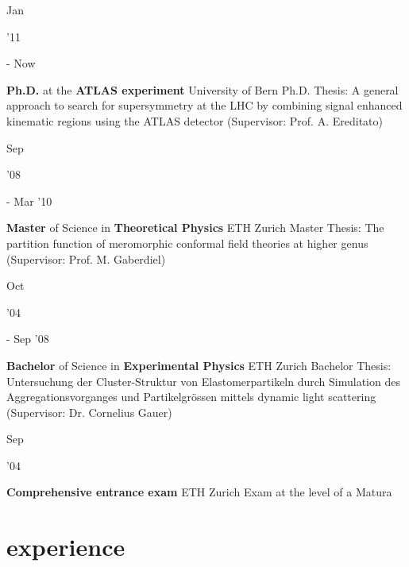 \documentclass[]{cv} %
\begin{document}
\begin{entrylist}
\entry
{\parbox[t]{\parboxWidthOne}{Jan}\parbox[t]{\parboxWidthTwo}{\hfill '11} - Now}
{\textbf{Ph.D.} at the \textbf{ATLAS experiment}}
{University of Bern}
{Ph.D. Thesis: A general approach to search for supersymmetry at the LHC by combining signal enhanced kinematic regions using the ATLAS detector (Supervisor:
  Prof. A. Ereditato)}
\entry
{\parbox[t]{\parboxWidthOne}{Sep}\parbox[t]{\parboxWidthTwo}{\hfill '08} - Mar '10}
{\textbf{Master} of Science in \textbf{Theoretical Physics}}
{ETH Zurich}
{Master Thesis: The partition function of meromorphic conformal field theories at higher genus (Supervisor: Prof. M. Gaberdiel)}
\entry
{\parbox[t]{\parboxWidthOne}{Oct}\parbox[t]{\parboxWidthTwo}{\hfill '04} - Sep '08}
{\textbf{Bachelor} of Science in \textbf{Experimental Physics}}
{ETH Zurich}
{Bachelor Thesis: Untersuchung der Cluster-Struktur von Elastomerpartikeln durch Simulation des Aggregationsvorganges und Partikelgr{\"o}ssen mittels dynamic
light scattering (Supervisor: Dr. Cornelius Gauer)}
\entry
{\parbox[t]{\parboxWidthOne}{Sep}\parbox[t]{\parboxWidthTwo}{\hfill '04}}
{\textbf{Comprehensive entrance exam}}
{ETH Zurich}
{Exam at the level of a Matura}
\end{entrylist}

\vspace{30pt}
\section{experience}
\end{document}
